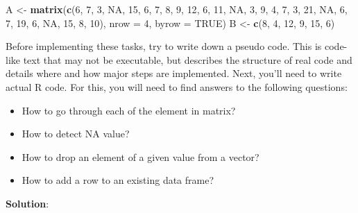 \documentclass[
]{book}
\newenvironment{Shaded}{\begin{snugshade}}{\end{snugshade}}
\newcommand{\DataTypeTok}[1]{\textcolor[rgb]{0.13,0.29,0.53}{#1}}
\newcommand{\DecValTok}[1]{\textcolor[rgb]{0.00,0.00,0.81}{#1}}
\newcommand{\KeywordTok}[1]{\textcolor[rgb]{0.13,0.29,0.53}{\textbf{#1}}}
\newcommand{\NormalTok}[1]{#1}
\newcommand{\OtherTok}[1]{\textcolor[rgb]{0.56,0.35,0.01}{#1}}
\newcommand{\StringTok}[1]{\textcolor[rgb]{0.31,0.60,0.02}{#1}}
\providecommand{\tightlist}{%
  \setlength{\itemsep}{0pt}\setlength{\parskip}{0pt}}
\begin{document}
\begin{Shaded}
\begin{Highlighting}[]
\NormalTok{A <-}\StringTok{ }\KeywordTok{matrix}\NormalTok{(}\KeywordTok{c}\NormalTok{(}\DecValTok{6}\NormalTok{, }\DecValTok{7}\NormalTok{, }\DecValTok{3}\NormalTok{, }\OtherTok{NA}\NormalTok{, }\DecValTok{15}\NormalTok{, }\DecValTok{6}\NormalTok{, }\DecValTok{7}\NormalTok{, }
              \DecValTok{8}\NormalTok{, }\DecValTok{9}\NormalTok{, }\DecValTok{12}\NormalTok{, }\DecValTok{6}\NormalTok{, }\DecValTok{11}\NormalTok{, }\OtherTok{NA}\NormalTok{, }\DecValTok{3}\NormalTok{, }
              \DecValTok{9}\NormalTok{, }\DecValTok{4}\NormalTok{, }\DecValTok{7}\NormalTok{, }\DecValTok{3}\NormalTok{, }\DecValTok{21}\NormalTok{, }\OtherTok{NA}\NormalTok{, }\DecValTok{6}\NormalTok{, }
              \DecValTok{7}\NormalTok{, }\DecValTok{19}\NormalTok{, }\DecValTok{6}\NormalTok{, }\OtherTok{NA}\NormalTok{, }\DecValTok{15}\NormalTok{, }\DecValTok{8}\NormalTok{, }\DecValTok{10}\NormalTok{),}
            \DataTypeTok{nrow =} \DecValTok{4}\NormalTok{, }\DataTypeTok{byrow =} \OtherTok{TRUE}\NormalTok{)}
\NormalTok{B <-}\StringTok{ }\KeywordTok{c}\NormalTok{(}\DecValTok{8}\NormalTok{, }\DecValTok{4}\NormalTok{, }\DecValTok{12}\NormalTok{, }\DecValTok{9}\NormalTok{, }\DecValTok{15}\NormalTok{, }\DecValTok{6}\NormalTok{)}
\end{Highlighting}
\end{Shaded}

Before implementing these tasks, try to write down a pseudo code. This is code-like text that may not be executable, but describes the structure of real code and details where and how major steps are implemented. Next, you'll need to write actual R code. For this, you will need to find answers to the following questions:

\begin{itemize}
\tightlist
\item
  How to go through each of the element in matrix?
\item
  How to detect NA value?
\item
  How to drop an element of a given value from a vector?
\item
  How to add a row to an existing data frame?
\end{itemize}

\textbf{Solution}:
\end{document}

